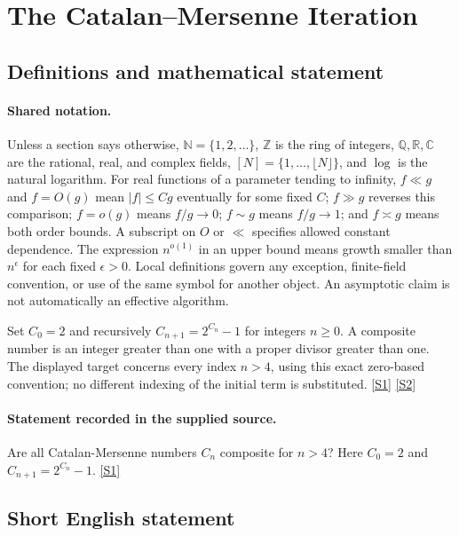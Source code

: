 \documentclass[11pt,a4paper]{article}
\newcommand{\N}{\mathbb{N}}
\newcommand{\Z}{\mathbb{Z}}
\newcommand{\Q}{\mathbb{Q}}
\newcommand{\R}{\mathbb{R}}
\newcommand{\C}{\mathbb{C}}
\newcommand{\sref}[2]{\hyperlink{source:#1:#2}{[S#2]}}
\begin{document}
\section{The Catalan--Mersenne Iteration}\label{statement}


\subsection{Definitions and mathematical statement}

\paragraph{Shared notation.}Unless a section says otherwise, $\N=\{1,2,\ldots\}$,
$\Z$ is the ring of integers, $\Q,\R,\C$ are the rational, real, and complex
fields, $[N]=\{1,\ldots,\lfloor N\rfloor\}$, and $\log$ is the natural
logarithm. For real functions of a parameter tending to infinity,
$f\ll g$ and $f=O(g)$ mean $|f|\leq Cg$ eventually for some fixed $C$;
$f\gg g$ reverses this comparison; $f=o(g)$ means $f/g\to0$;
$f\sim g$ means $f/g\to1$; and $f\asymp g$ means both order bounds.
A subscript on $O$ or $\ll$ specifies allowed constant dependence.
The expression $n^{o(1)}$ in an upper bound means growth smaller than
$n^\epsilon$ for each fixed $\epsilon>0$. Local definitions govern any
exception, finite-field convention, or use of the same symbol for another
object. An asymptotic claim is not automatically an effective algorithm.



Set $C_0=2$ and recursively $C_{n+1}=2^{C_n}-1$ for integers $n\geq0$. A composite number is an integer greater than one with a proper divisor greater than one. The displayed target concerns every index $n>4$, using this exact zero-based convention; no different indexing of the initial term is substituted. \sref{statement}{1} \sref{statement}{2}

\paragraph{Statement recorded in the supplied source.}
Are all Catalan-Mersenne numbers $C_n$ composite for $n > 4$? Here $C_0 = 2$ and $C_{n+1} = 2^{C_n} - 1$. \sref{statement}{1}

\subsection{Short English statement}
\end{document}
